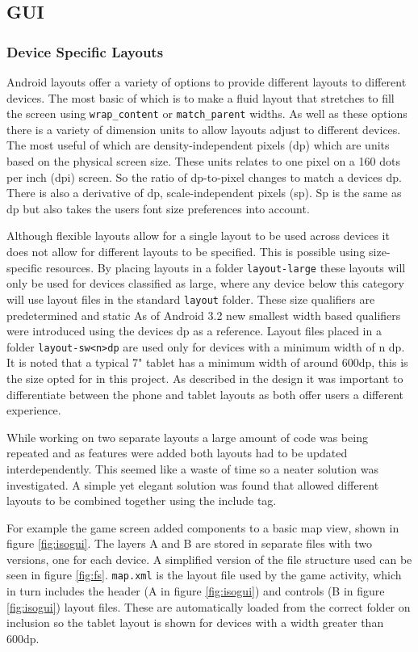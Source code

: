 \subsection{GUI}
\subsubsection*{Device Specific Layouts}
Android layouts offer a variety of options to provide different layouts to different devices. The most basic of which is to make a fluid layout that stretches to fill the screen using \verb|wrap_content| or \verb|match_parent| widths. As well as these options there is a variety of dimension units to allow layouts adjust to different devices. The most useful of which are density-independent pixels (dp) which are units based on the physical screen size. These units relates to one pixel on a 160 dots per inch (dpi) screen. So the ratio of dp-to-pixel changes to match a devices dp. There is also a derivative of dp, scale-independent pixels (sp). Sp is the same as dp but also takes the users font size preferences into account.

Although flexible layouts allow for a single layout to be used across devices it does not allow for different layouts to be specified. This is possible using size-specific resources\cite{screensizes}. By placing layouts in a folder \verb|layout-large| these layouts will only be used for devices classified as large, where any device below this category will use layout files in the standard \verb|layout| folder. These size qualifiers are predetermined and static As of Android 3.2 new smallest width based qualifiers were introduced using the devices dp as a reference. Layout files placed in a folder \verb|layout-sw<n>dp| are used only for devices with a minimum width of n dp. It is noted that a typical 7" tablet has a minimum width of around 600dp, this is the size opted for in this project. As described in the design it was important to differentiate between the phone and tablet layouts as both offer users a different experience.

While working on two separate layouts a large amount of code was being repeated and as features were added both layouts had to be updated interdependently. This seemed like a waste of time so a neater solution was investigated. A simple yet elegant solution was found that allowed different layouts to be combined together using the include tag.

For example the game screen added components to a basic map view, shown in figure \ref{fig:isogui}. The layers A and B are stored in separate files with two versions, one for each device. A simplified version of the file structure used can be seen in figure \ref{fig:fs}. \verb|map.xml| is the layout file used by the game activity, which in turn includes the header (A in figure \ref{fig:isogui}) and controls (B in figure \ref{fig:isogui}) layout files. These are automatically loaded from the correct folder on inclusion so the tablet layout is shown for devices with a width greater than 600dp.

